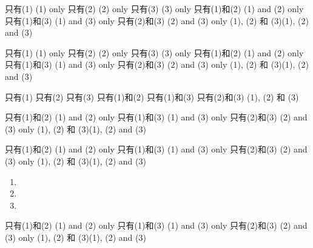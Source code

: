 \begin{tasks}
    \task 只有(1) \tab (1) only
    \task 只有(2) \tab (2) only
    \task 只有(3) \tab (3) only
    \task 只有(1)和(2) \tab (1) and (2) only
    \task 只有(1)和(3) \tab (1) and (3) only
    \task 只有(2)和(3) \tab (2) and (3) only
    \task (1), (2) 和 (3)\tab (1), (2) and (3)
\end{tasks}

\begin{tasks}
    \task 只有(1) \tab\tab (1) only
    \task 只有(2) \tab\tab (2) only
    \task 只有(3) \tab\tab (3) only
    \task 只有(1)和(2) \tab\tab (1) and (2) only
    \task 只有(1)和(3) \tab\tab (1) and (3) only
    \task 只有(2)和(3) \tab\tab (2) and (3) only
    \task (1), (2) 和 (3)\tab\tab (1), (2) and (3)
\end{tasks}

\begin{tasks}
    \task 只有(1)
    \task 只有(2)
    \task 只有(3)
    \task 只有(1)和(2)
    \task 只有(1)和(3)
    \task 只有(2)和(3)
    \task (1), (2) 和 (3)
\end{tasks}


\begin{choices}
    \choice 只有(1)和(2) \tab (1) and (2) only
    \choice 只有(1)和(3) \tab (1) and (3) only
    \choice 只有(2)和(3) \tab (2) and (3) only
    \choice (1), (2) 和 (3)\tab (1), (2) and (3)
\end{choices}
\begin{choices}
    \choice 只有(1)和(2) \tab (1) and (2) only
    \choice 只有(1)和(3) \tab (1) and (3) only
    \choice 只有(2)和(3) \tab (2) and (3) only
    \choice (1), (2) 和 (3)\tab (1), (2) and (3)
\end{choices}


\question\vspace{1cm}
\begin{samepage}
    \begin{enumerate}[label=\sd]
        \item
              \par
        \item
              \par
        \item
              \par
    \end{enumerate}
\end{samepage}
\begin{samepage}
    \begin{choices}
        \choice 只有(1)和(2) \tab (1) and (2) only
        \choice 只有(1)和(3) \tab (1) and (3) only
        \choice 只有(2)和(3) \tab (2) and (3) only
        \choice (1), (2) 和 (3)\tab (1), (2) and (3)
    \end{choices}
\end{samepage}

